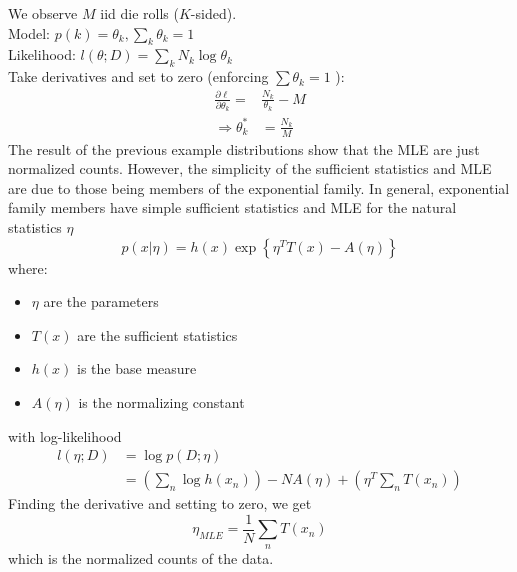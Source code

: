 \documentclass[11pt]{article}
\begin{document}
\example[Multinomial]
We observe $M$ iid die rolls ($K$-sided). \\
Model: $p(k) = \theta_k, \sum_k \theta_k = 1$ \\
Likelihood: $l(\theta; D) = \sum_k N_k \log \theta_k$ \\
Take derivatives and set to zero (enforcing \(\sum \theta_{k}=1\) ):
\[
\begin{aligned}
\frac{\partial \ell}{\partial \theta_{k}}=& \frac{N_{k}}{\theta_{k}}-M \\
 \Rightarrow \theta_{k}^{*}&=\frac{N_{k}}{M}
\end{aligned}
\]
The result of the previous example distributions show that the MLE are just normalized counts. However, the simplicity of the sufficient statistics and MLE are due to those being members of the exponential family.
In general, exponential family members have simple sufficient statistics and MLE for the natural statistics $\eta$
\[
p(x | \eta)=h(x) \exp \left\{\eta^{T} T(x)-A(\eta)\right\}
\]
where:
\begin{itemize}
	\item $\eta$ are the parameters
	\item $T(x)$ are the sufficient statistics
	\item $h(x)$ is the base measure
	\item $A(\eta)$ is the normalizing constant
\end{itemize}
with log-likelihood
\begin{align*}
	l(\eta; D) &= \log p(D;\eta)\\
	&= (\sum_n\log h(x_n)) - NA(\eta) + (\eta^T\sum_n T(x_n))
\end{align*}
Finding the derivative and setting to zero, we get
$$\eta_{MLE} = \frac{1}{N}\sum_n T(x_n)$$
which is the normalized counts of the data.
\end{document}
